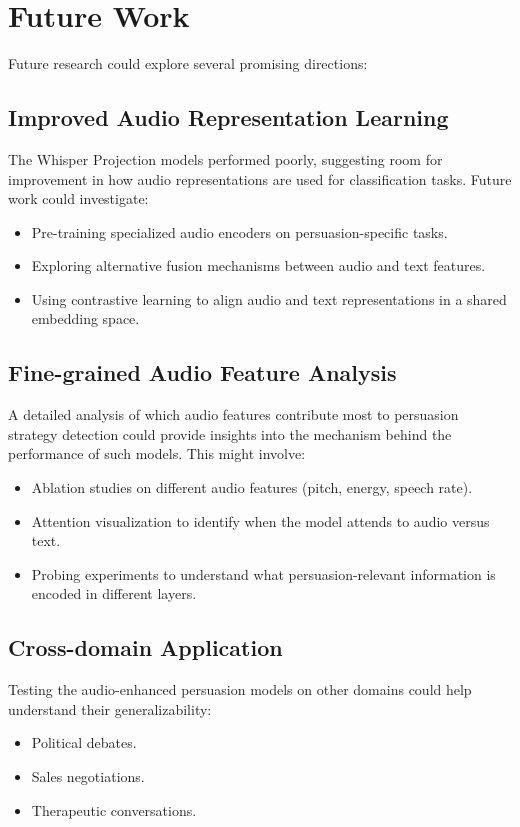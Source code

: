 \documentclass{article}
\begin{document}
\section{Future Work}
Future research could explore several promising directions:

\subsection{Improved Audio Representation Learning}
The Whisper Projection models performed poorly, suggesting room for improvement in how audio representations are used for classification tasks. Future work could investigate:
\begin{itemize}
    \item Pre-training specialized audio encoders on persuasion-specific tasks.
    \item Exploring alternative fusion mechanisms between audio and text features.
    \item Using contrastive learning to align audio and text representations in a shared embedding space.
\end{itemize}

\subsection{Fine-grained Audio Feature Analysis}
A detailed analysis of which audio features contribute most to persuasion strategy detection could provide insights into the mechanism behind the performance of such models. This might involve:
\begin{itemize}
    \item Ablation studies on different audio features (pitch, energy, speech rate).
    \item Attention visualization to identify when the model attends to audio versus text.
    \item Probing experiments to understand what persuasion-relevant information is encoded in different layers.
\end{itemize}

\subsection{Cross-domain Application}
Testing the audio-enhanced persuasion models on other domains could help understand their generalizability:
\begin{itemize}
    \item Political debates.
    \item Sales negotiations.
    \item Therapeutic conversations.
\end{itemize}
\end{document}
